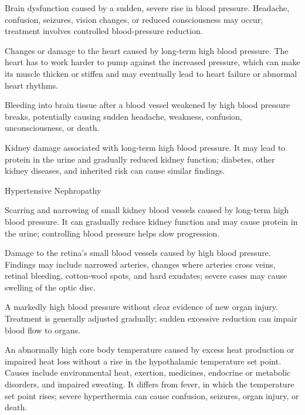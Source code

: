  Brain dysfunction caused by a sudden, severe rise in blood pressure. Headache, confusion, seizures, vision changes, or reduced consciousness may occur; treatment involves controlled blood-pressure reduction.

 Changes or damage to the heart caused by long-term high blood pressure. The heart has to work harder to pump against the increased pressure, which can make its muscle thicken or stiffen and may eventually lead to heart failure or abnormal heart rhythms.

 Bleeding into brain tissue after a blood vessel weakened by high blood pressure breaks, potentially causing sudden headache, weakness, confusion, unconsciousness, or death.

 Kidney damage associated with long-term high blood pressure. It may lead to protein in the urine and gradually reduced kidney function; diabetes, other kidney diseases, and inherited risk can cause similar findings.

\synonyms
Hypertensive Nephropathy

 Scarring and narrowing of small kidney blood vessels caused by long-term high blood pressure. It can gradually reduce kidney function and may cause protein in the urine; controlling blood pressure helps slow progression.

 Damage to the retina’s small blood vessels caused by high blood pressure. Findings may include narrowed arteries, changes where arteries cross veins, retinal bleeding, cotton-wool spots, and hard exudates; severe cases may cause swelling of the optic disc.

 A markedly high blood pressure without clear evidence of new organ injury. Treatment is generally adjusted gradually; sudden excessive reduction can impair blood flow to organs.

 An abnormally high core body temperature caused by excess heat production or impaired heat loss without a rise in the hypothalamic temperature set point. Causes include environmental heat, exertion, medicines, endocrine or metabolic disorders, and impaired sweating. It differs from fever, in which the temperature set point rises; severe hyperthermia can cause confusion, seizures, organ injury, or death.

